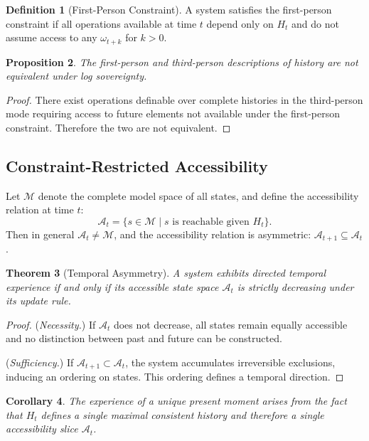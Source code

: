 \documentclass[12pt, a4paper]{article}
\theoremstyle{plain}
\newtheorem{theorem}{Theorem}[section]
\newtheorem{proposition}[theorem]{Proposition}
\newtheorem{corollary}[theorem]{Corollary}
\theoremstyle{definition}
\newtheorem{definition}[theorem]{Definition}
\theoremstyle{remark}
\begin{document}
\begin{definition}[First-Person Constraint]
A system satisfies the first-person constraint if all operations available at time $t$ depend only on $H_t$ and do not assume access to any $\omega_{t+k}$ for $k > 0$.
\end{definition}

\begin{proposition}
The first-person and third-person descriptions of history are not equivalent under log sovereignty.
\end{proposition}

\begin{proof}
There exist operations definable over complete histories in the third-person mode requiring access to future elements not available under the first-person constraint. Therefore the two are not equivalent.
\end{proof}

\subsection{Constraint-Restricted Accessibility}

Let $\mathcal{M}$ denote the complete model space of all states, and define the accessibility relation at time $t$:
\[
\mathcal{A}_t = \{ s \in \mathcal{M} \mid s \text{ is reachable given } H_t \}.
\]
Then in general $\mathcal{A}_t \neq \mathcal{M}$, and the accessibility relation is asymmetric: $\mathcal{A}_{t+1} \subseteq \mathcal{A}_t$.

\begin{theorem}[Temporal Asymmetry]
\label{thm:temporal}
A system exhibits directed temporal experience if and only if its accessible state space $\mathcal{A}_t$ is strictly decreasing under its update rule.
\end{theorem}

\begin{proof}
(\textit{Necessity.}) If $\mathcal{A}_t$ does not decrease, all states remain equally accessible and no distinction between past and future can be constructed.

(\textit{Sufficiency.}) If $\mathcal{A}_{t+1} \subset \mathcal{A}_t$, the system accumulates irreversible exclusions, inducing an ordering on states. This ordering defines a temporal direction.
\end{proof}

\begin{corollary}
The experience of a unique present moment arises from the fact that $H_t$ defines a single maximal consistent history and therefore a single accessibility slice $\mathcal{A}_t$.
\end{corollary}
\end{document}
